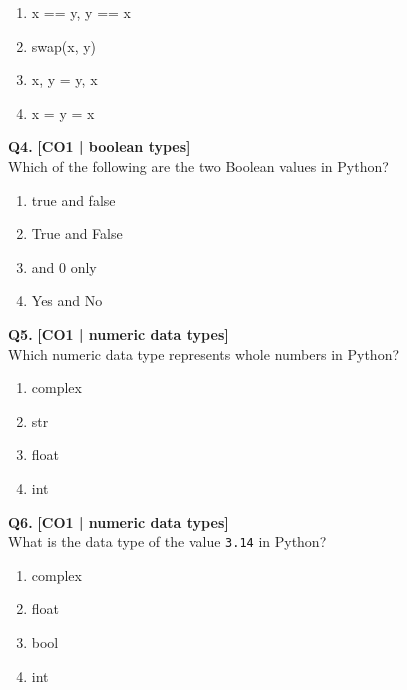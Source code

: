 \begin{enumerate}[label=(\alph*),topsep=2pt,itemsep=1pt,partopsep=0pt,parsep=0pt]
    \item \relax x == y, y == x
    \item \relax swap(x, y)
    \item \relax x, y = y, x
    \item \relax x = y = x
\end{enumerate}
\vspace{{2mm}}

\noindent\textbf{Q4.} \hfill {\small\color{LPUOrange}\textbf{[CO1 | boolean types]}}\\[2pt]
Which of the following are the two Boolean values in Python?

\begin{enumerate}[label=(\alph*),topsep=2pt,itemsep=1pt,partopsep=0pt,parsep=0pt]
    \item \relax true and false
    \item \relax True and False
    \item {} and 0 only
    \item \relax Yes and No
\end{enumerate}
\vspace{{2mm}}

\noindent\textbf{Q5.} \hfill {\small\color{LPUOrange}\textbf{[CO1 | numeric data types]}}\\[2pt]
Which numeric data type represents whole numbers in Python?

\begin{enumerate}[label=(\alph*),topsep=2pt,itemsep=1pt,partopsep=0pt,parsep=0pt]
    \item \relax complex
    \item \relax str
    \item \relax float
    \item \relax int
\end{enumerate}
\vspace{{2mm}}

\noindent\textbf{Q6.} \hfill {\small\color{LPUOrange}\textbf{[CO1 | numeric data types]}}\\[2pt]
What is the data type of the value \texttt{3.14} in Python?

\begin{enumerate}[label=(\alph*),topsep=2pt,itemsep=1pt,partopsep=0pt,parsep=0pt]
    \item \relax complex
    \item \relax float
    \item \relax bool
    \item \relax int
\end{enumerate}
\vspace{{2mm}}

